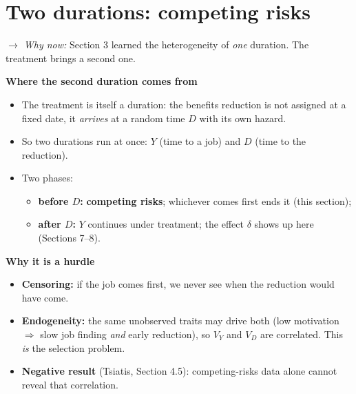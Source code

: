 \documentclass[11pt]{article}
\newcommand{\1}{\mathbf{1}}
\newcommand{\whynow}[1]{\par\noindent\textit{$\rightarrow$ Why now:} #1\par}
\begin{document}
\section{Two durations: competing risks}
\whynow{Section 3 learned the heterogeneity of \emph{one} duration. The treatment brings a second one.}

\textbf{Where the second duration comes from}
\begin{itemize}
  \item The treatment is itself a duration: the benefits reduction is not assigned at a fixed date, it \emph{arrives} at a random time $D$ with its own hazard.
  \item So two durations run at once: $Y$ (time to a job) and $D$ (time to the reduction).
  \item Two phases:
    \begin{itemize}
      \item \textbf{before $D$:} \textbf{competing risks}; whichever comes first ends it (this section);
      \item \textbf{after $D$:} $Y$ continues under treatment; the effect $\delta$ shows up here (Sections 7--8).
    \end{itemize}
\end{itemize}

\textbf{Why it is a hurdle}
\begin{itemize}
  \item \textbf{Censoring:} if the job comes first, we never see when the reduction would have come.
  \item \textbf{Endogeneity:} the same unobserved traits may drive both (low motivation $\Rightarrow$ slow job finding \emph{and} early reduction), so $V_Y$ and $V_D$ are correlated. This \emph{is} the selection problem.
  \item \textbf{Negative result} (Tsiatis, Section 4.5): competing-risks data alone cannot reveal that correlation.
\end{itemize}
\end{document}

